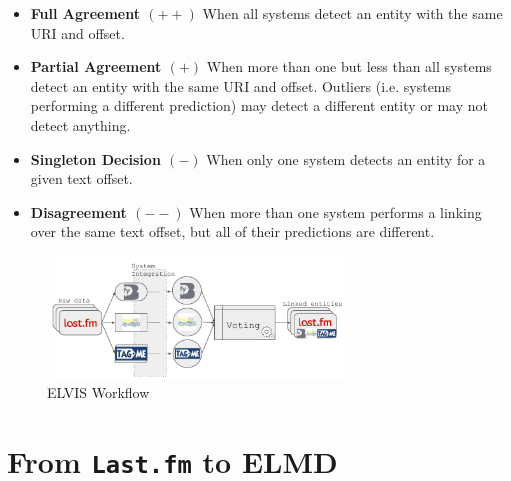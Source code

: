 \begin{itemize}
    \item \textbf{Full Agreement $(++)$} When all systems detect an entity with the same URI and offset.
    \item \textbf{Partial Agreement $(+)$} When more than one but less than all systems detect an entity with the same URI and offset. Outliers (i.e. systems performing a different prediction) may detect a different entity or may not detect anything.
    \item \textbf{Singleton Decision $(-)$} When only one system detects an entity for a given text offset.
    \item \textbf{Disagreement $(--)$} When more than one system performs a linking over the same text offset, but all of their predictions are different.
\end{itemize}



\begin{figure}[h!]
  \centering
	\includegraphics[height=3.25cm,width=8cm]{ch03_linking_pics/workflow.pdf}
  \caption{ELVIS Workflow}
  \label{fig:linking:workflow}
\end{figure}


\section{From \texttt{Last.fm} to \textsc{ELMD}}
\label{sec:linking:lastfm}

